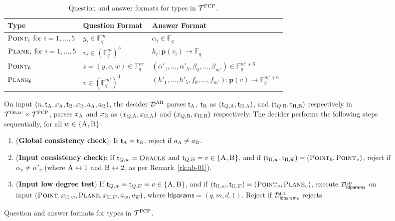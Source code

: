 \documentclass[11pt]{article}
\theoremstyle{definition}
\newcommand{\ol}[1]{\overline{#1}}
\newcommand{\F}{\ensuremath{\mathbb{F}}}
\newcommand{\ld}{\textsc{ld}}
\newcommand{\pl}{\mathbf{p}}
\newcommand{\decider}{\mathcal{D}}
\newcommand{\type}{\mathcal{T}}
\newcommand{\gamestyle}[1]{\ensuremath{\textsc{#1}}\xspace}
\newcommand{\ora}{\gamestyle{Orac}}
\newcommand{\pcp}{\gamestyle{PCP}}
\newcommand{\ar}{\gamestyle{AR}}
\newcommand{\labelstyle}[1]{\ensuremath{\textsc{#1}}\xspace}
\newcommand{\tvarstyle}[1]{\mathsf{#1}}
\newcommand{\tvar}{\ensuremath{\tvarstyle{t}}}
\newcommand{\alice}{\labelstyle{A}}
\newcommand{\bob}{\labelstyle{B}}
\newcommand{\oracle}{\labelstyle{Oracle}}
\newcommand{\typestyle}[1]{\ensuremath{\textsc{#1}}\xspace}
\newcommand{\Plane}{\typestyle{Plane}}
\newcommand{\Point}{\typestyle{Point}}
\newcommand{\ldparams}{\mathsf{ldparams}}
\newenvironment{gamespec}{
  \begin{mdframed}[style=figstyle]}{
  \end{mdframed}}
\begin{document}
\begin{figure}[!htb]
  \small
  \begin{gamespec}
    \begin{table}[H]
      \centering
      \begin{tabularx}{\textwidth}{ l l X }
        \toprule
        Type & Question Format & Answer Format \\
        \midrule
        $\Point_i$ for $i=1, \ldots, 5$ & $y_i \in \F_q^m$ &
        $\alpha_i \in \F_q$ \\
        $\Plane_i$ for $i=1, \ldots, 5$ & $v_i \in (\F_q^m)^3$ &
        $h_i: \pl(v_i) \to \F_q$ \\
        $\Point_6$ & $z = (y, o, w) \in \F_q^{m'}$ & $(\alpha'_1, \ldots,
        \alpha'_5, \beta_0, \ldots, \beta_{m'}) \in \F_q^{m'+6}$\\
        $\Plane_6$ & $v \in (\F_q^{m'})^3$ & $(h'_1, \dots,
        h'_5, f_0, \dots, f_{m'}): \pl(v) \to \F_q^{m' + 6}$ \\
        \bottomrule
      \end{tabularx}
      \caption{Question and answer formats for types in $\type^\pcp$.}
    \end{table}

    On input $(n, \tvar_\alice, x_\alice, \tvar_\bob, x_\bob, a_\alice,
    a_\bob)$, the decider $\decider^\ar$ parses $\tvar_\alice$, $\tvar_\bob$ as
    $(\tvar_{Q,\alice}, \tvar_{\Pi, \alice})$, and $(\tvar_{Q,\bob},
    \tvar_{\Pi,\bob})$ respectively in $ \type^\ora \times \type^\pcp$, parses
    $x_\alice$ and $x_\bob$ as $(x_{Q,\alice}, x_{\Pi,\alice})$ and
    $(x_{Q,\bob}, x_{\Pi,\bob})$ respectively.
    The decider performs the following steps sequentially, for all
    $w\in\{\alice,\bob\}$:
    \begin{enumerate}
    \item (\textbf{Global consistency check}): If $\tvar_{\alice} =
      \tvar_{\bob}$, reject if $a_\alice\neq a_\bob$.
      \label{enu:ar-global-consistency}

    \item (\textbf{Input consistency check}): If $\tvar_{Q,w} = \oracle$ and
      $\tvar_{Q, \ol{w}} = v \in \{\alice,\bob\}$, and if $(\tvar_{\Pi,w},
      \tvar_{\Pi, \ol{w}}) = (\Point_6, \Point_{v})$, reject if $\alpha_{v} \neq
      \alpha'_{v}$ (where $\alice \leftrightarrow 1$ and $\bob \leftrightarrow
      2$, as per Remark~\ref{rk:ab-01}).
      \label{enu:ar-input-consistency}

    \item (\textbf{Input low degree test}) If $\tvar_{Q,w} = \tvar_{Q,\ol{w}} =
      v \in \{\alice,\bob\}$, and if $(\tvar_{\Pi,w}, \tvar_{\Pi, \ol{w}}) =
      (\Point_{v}, \Plane_{v})$, execute $\decider^\ld_\ldparams$ on input
      $(\Point, x_{\Pi,w} ,\Plane,x_{\Pi,\overline{w}}, a_w,a_{\ol{w}})$, where
      $\ldparams = (q,m,d,1)$.
      Reject if $\decider^\ld_{\ldparams}$ rejects.
      \label{enu:ar-input-ld}


\end{enumerate}
\end{gamespec}
\end{figure}
\end{document}
